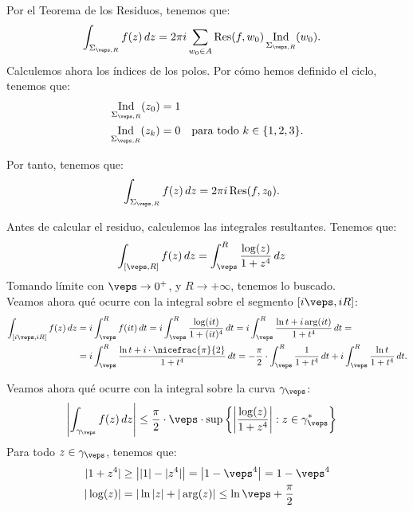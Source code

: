 \documentclass[12pt]{article}
\DeclareMathOperator{\Ind}{Ind}
\DeclareMathOperator{\Res}{Res}
\begin{document}
\begin{ejercicio}[2.5 puntos]
    Por el Teorema de los Residuos, tenemos que:
    \begin{align*}
        \int_{\Sigma_{\veps, R}} f(z) \, dz &= 2\pi i\sum_{w_0\in A}\Res(f,w_0)\Ind_{\Sigma_{\veps, R}}(w_0).
    \end{align*}
    Calculemos ahora los índices de los polos. Por cómo hemos definido el ciclo, tenemos que:
    \begin{align*}
        \Ind_{\Sigma_{\veps, R}}(z_0) &= 1\\
        \Ind_{\Sigma_{\veps, R}}(z_k) &= 0 \quad \text{para todo } k\in \{1, 2, 3\}.
    \end{align*}

    Por tanto, tenemos que:
    \begin{align*}
        \int_{\Sigma_{\veps, R}} f(z) \, dz &= 2\pi i\Res(f, z_0).
    \end{align*}

    Antes de calcular el residuo, calculemos las integrales resultantes. Tenemos que:
    \begin{align*}
        \int_{[\veps, R]} f(z) \, dz &= \int_{\veps}^{R} \frac{\log(z)}{1 + z^4} \, dz
    \end{align*}
    Tomando límite con $\veps\to 0^+$, y $R\to +\infty$, tenemos lo buscado.\\

    Veamos ahora qué ocurre con la integral sobre el segmento $[i\veps, iR]$:
    \begin{align*}
        \int_{[i\veps, iR]} f(z) \, dz &= i\int_{\veps}^{R} f(it) \, dt
        = i\int_{\veps}^{R} \frac{\log(it)}{1 + (it)^4} \, dt
        = i\int_{\veps}^{R} \frac{\ln t + i\arg(it)}{1 + t^4} \, dt
        =\\&= i\int_{\veps}^{R} \frac{\ln t + i\cdot \nicefrac{\pi}{2}}{1 + t^4} \, dt
        = -\frac{\pi}{2}\cdot \int_{\veps}^{R} \frac{1}{1 + t^4} \, dt + i\int_{\veps}^{R} \frac{\ln t}{1 + t^4} \, dt.
    \end{align*}

    Veamos ahora qué ocurre con la integral sobre la curva $\gamma_{\veps}$:
    \begin{align*}
        \left|\int_{\gamma_{\veps}} f(z) \, dz\right| &\leq \frac{\pi}{2}\cdot \veps \cdot \sup\left\{\left|\dfrac{\log(z)}{1 + z^4}\right| : z\in \gamma_{\veps}^*\right\}
    \end{align*}
    Para todo $z\in \gamma_{\veps}$, tenemos que:
    \begin{align*}
        |1+z^4| &\geq \left||1| - |z^4|\right| = \left|1 - \veps^4\right| = 1 - \veps^4\\
        |\log(z)| &= |\ln|z| + |\arg(z)|\leq \ln\veps + \frac{\pi}{2}
    \end{align*}


\end{ejercicio}
\end{document}
